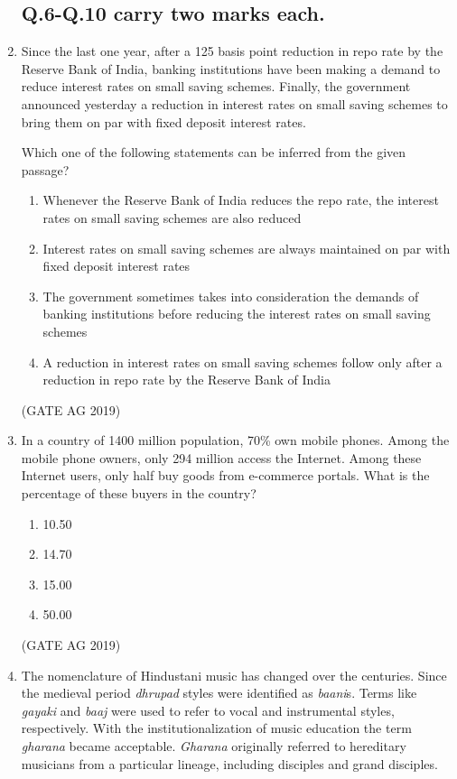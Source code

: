 \documentclass[journal,12pt,onecolumn]{IEEEtran}
\theoremstyle{remark}
\begin{document}
\begin{enumerate}
\subsection*{\textbf{Q.6-Q.10 carry two marks each.}}

\item Since the last one year, after a 125 basis point reduction in repo rate by the Reserve Bank of India, banking institutions have been making a demand to reduce interest rates on small saving schemes. Finally, the government announced yesterday a reduction in interest rates on small saving schemes to bring them on par with fixed deposit interest rates.

Which one of the following statements can be inferred from the given passage?

\begin{enumerate}
    \item Whenever the Reserve Bank of India reduces the repo rate, the interest rates on small saving schemes are also reduced
    \item Interest rates on small saving schemes are always maintained on par with fixed deposit interest rates
    \item The government sometimes takes into consideration the demands of banking institutions before reducing the interest rates on small saving schemes
    \item A reduction in interest rates on small saving schemes follow only after a reduction in repo rate by the Reserve Bank of India
\end{enumerate}
\hfill{(GATE AG 2019)}

\item In a country of 1400 million population, 70\% own mobile phones. Among the mobile phone owners, only 294 million access the Internet. Among these Internet users, only half buy goods from e-commerce portals. What is the percentage of these buyers in the country?

\begin{multicols}{4}
\begin{enumerate}
    \item 10.50
    \item 14.70
    \item 15.00
    \item 50.00
\end{enumerate}
\end{multicols}
\hfill{(GATE AG 2019)}

\item The nomenclature of Hindustani music has changed over the centuries. Since the medieval period \textit{dhrupad} styles were identified as \textit{baani}s. Terms like \textit{gayaki} and \textit{baaj} were used to refer to vocal and instrumental styles, respectively. With the institutionalization of music education the term \textit{gharana} became acceptable. \textit{Gharana} originally referred to hereditary musicians from a particular lineage, including disciples and grand disciples.




\end{enumerate}
\end{document}
